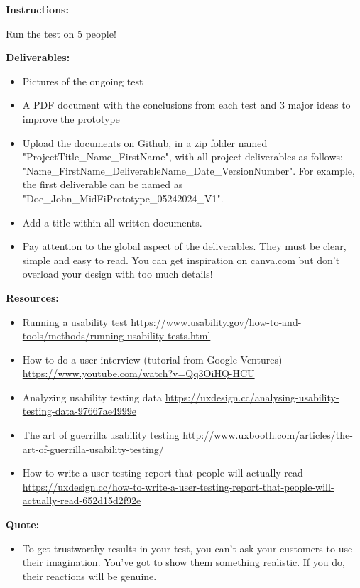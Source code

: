 \makeheaderfiles

\textbf{Instructions:}

Run the test on 5 people!

\textbf{Deliverables:}

\begin{itemize}
\item Pictures of the ongoing test
\item A PDF document with the conclusions from each test and 3 major ideas to improve the prototype
\item Upload the documents on Github, in a zip folder named "ProjectTitle\_Name\_FirstName", with all project deliverables as follows: "Name\_FirstName\_DeliverableName\_Date\_VersionNumber".  For example, the first deliverable can be named as "Doe\_John\_MidFiPrototype\_05242024\_V1".
\item Add a title within all written documents.
\item Pay attention to the global aspect of the deliverables. They must be clear, simple and easy to read. You can get inspiration on canva.com but don't overload your design with too much details!
\end{itemize}

\textbf{Resources:}

\begin{itemize}
\item Running a usability test \url{https://www.usability.gov/how-to-and-tools/methods/running-usability-tests.html}
\item How to do a user interview (tutorial from Google Ventures) \url{https://www.youtube.com/watch?v=Qq3OiHQ-HCU}
\item Analyzing usability testing data \url{https://uxdesign.cc/analysing-usability-testing-data-97667ae4999e}
\item The art of guerrilla usability testing \url{http://www.uxbooth.com/articles/the-art-of-guerrilla-usability-testing/}
\item How to write a user testing report that people will actually read \url{https://uxdesign.cc/how-to-write-a-user-testing-report-that-people-will-actually-read-652d15d2f92e}
\end{itemize}

\textbf{Quote:}

\begin{itemize}
\item To get trustworthy results in your test, you can't ask your customers to use their imagination. You've got to show them something realistic. If you do, their reactions will be genuine.
\end{itemize}

